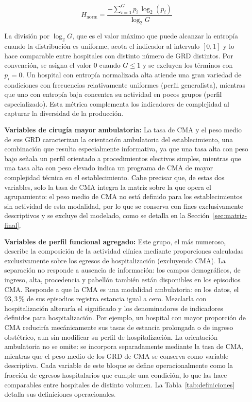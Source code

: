 \begin{equation}
H_{\text{norm}} = \frac{-\sum_{i=1}^{G} p_i \, \log_2(p_i)}{\log_2 G}
\label{eq:shannon}
\end{equation}

La división por $\log_2 G$, que es el valor máximo que puede alcanzar la
entropía cuando la distribución es uniforme, acota el indicador al intervalo
$[0, 1]$ y lo hace comparable entre hospitales con distinto número de GRD
distintos. Por convención, se asigna el valor 0 cuando $G \leq 1$ y se excluyen
los términos con $p_i = 0$. Un hospital con entropía normalizada alta atiende una
gran variedad de condiciones con frecuencias relativamente uniformes (perfil
generalista), mientras que uno con entropía baja concentra su actividad en pocos
grupos (perfil especializado). Esta métrica complementa los indicadores de
complejidad al capturar la diversidad de la producción.

\textbf{Variables de cirugía mayor ambulatoria:} La tasa de CMA y el peso medio de sus GRD caracterizan la orientación ambulatoria del establecimiento, una combinación que resulta especialmente informativa, ya que una tasa alta con peso bajo señala un perfil orientado a procedimientos electivos simples, mientras que una tasa alta con peso elevado indica un programa de CMA de mayor complejidad técnica en el establecimiento. Cabe precisar que, de estas dos variables, solo la tasa de CMA integra la matriz sobre la que opera el agrupamiento: el peso medio de CMA no está definido para los establecimientos sin actividad de esta modalidad, por lo que se conserva con fines exclusivamente descriptivos y se excluye del modelado, como se detalla en la Sección~\ref{sec:matriz-final}.

\textbf{Variables de perfil funcional agregado:}
Este grupo, el más numeroso, describe la composición de la actividad clínica
mediante proporciones calculadas exclusivamente sobre los egresos de
hospitalización (excluyendo CMA). La separación no responde a ausencia de información: los campos demográficos,
de ingreso, alta, procedencia y pabellón también están disponibles en los
episodios CMA. Responde a que la CMA es una modalidad ambulatoria: en los datos, el $93{,}3\,\%$ de sus episodios registra estancia igual a cero. Mezclarla con hospitalización alteraría el significado y los denominadores de indicadores definidos para hospitalización. Por ejemplo, un
hospital con mayor proporción de CMA reduciría mecánicamente sus tasas de
estancia prolongada o de ingreso obstétrico, aun sin modificar su perfil de
hospitalización. La orientación ambulatoria no se omite:
se incorpora separadamente mediante la tasa de CMA, mientras que el peso medio
de los GRD de CMA se conserva como variable descriptiva. Cada variable de este
bloque se define operacionalmente como la fracción de egresos hospitalarios que
cumple una condición, lo que las hace comparables entre hospitales de distinto
volumen. La Tabla~\ref{tab:definiciones} detalla sus definiciones operacionales.

